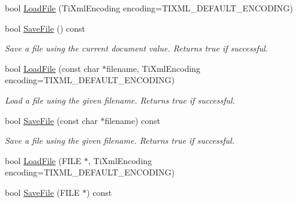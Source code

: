 \begin{DoxyCompactItemize}
\item 
bool \hyperlink{class_ti_xml_document_a4c852a889c02cf251117fd1d9fe1845f}{LoadFile} (TiXmlEncoding encoding=TIXML\_\-DEFAULT\_\-ENCODING)
\item 
\hypertarget{class_ti_xml_document_a21c0aeb0d0a720169ad4ac89523ebe93}{
bool \hyperlink{class_ti_xml_document_a21c0aeb0d0a720169ad4ac89523ebe93}{SaveFile} () const }
\label{class_ti_xml_document_a21c0aeb0d0a720169ad4ac89523ebe93}

\begin{DoxyCompactList}\small\item\em Save a file using the current document value. Returns true if successful. \item\end{DoxyCompactList}\item 
\hypertarget{class_ti_xml_document_a879cdf5e981b8b2d2ef82f2546dd28fb}{
bool \hyperlink{class_ti_xml_document_a879cdf5e981b8b2d2ef82f2546dd28fb}{LoadFile} (const char $\ast$filename, TiXmlEncoding encoding=TIXML\_\-DEFAULT\_\-ENCODING)}
\label{class_ti_xml_document_a879cdf5e981b8b2d2ef82f2546dd28fb}

\begin{DoxyCompactList}\small\item\em Load a file using the given filename. Returns true if successful. \item\end{DoxyCompactList}\item 
\hypertarget{class_ti_xml_document_ae869f5ebf7fc54c4a1d737fb4689fd44}{
bool \hyperlink{class_ti_xml_document_ae869f5ebf7fc54c4a1d737fb4689fd44}{SaveFile} (const char $\ast$filename) const }
\label{class_ti_xml_document_ae869f5ebf7fc54c4a1d737fb4689fd44}

\begin{DoxyCompactList}\small\item\em Save a file using the given filename. Returns true if successful. \item\end{DoxyCompactList}\item 
bool \hyperlink{class_ti_xml_document_a41f6fe7200864d1dca663d230caf8db6}{LoadFile} (FILE $\ast$, TiXmlEncoding encoding=TIXML\_\-DEFAULT\_\-ENCODING)
\item 
\hypertarget{class_ti_xml_document_acf1672b4538c6d1d441f9f108aea2bf4}{
bool \hyperlink{class_ti_xml_document_acf1672b4538c6d1d441f9f108aea2bf4}{SaveFile} (FILE $\ast$) const }
\label{class_ti_xml_document_acf1672b4538c6d1d441f9f108aea2bf4}


\end{DoxyCompactItemize}
